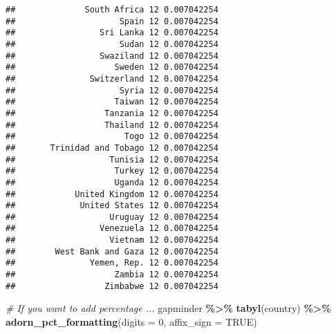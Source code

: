 \documentclass[
]{book}
\newenvironment{Shaded}{\begin{snugshade}}{\end{snugshade}}
\newcommand{\CommentTok}[1]{\textcolor[rgb]{0.56,0.35,0.01}{\textit{#1}}}
\newcommand{\DataTypeTok}[1]{\textcolor[rgb]{0.13,0.29,0.53}{#1}}
\newcommand{\DecValTok}[1]{\textcolor[rgb]{0.00,0.00,0.81}{#1}}
\newcommand{\KeywordTok}[1]{\textcolor[rgb]{0.13,0.29,0.53}{\textbf{#1}}}
\newcommand{\NormalTok}[1]{#1}
\newcommand{\OperatorTok}[1]{\textcolor[rgb]{0.81,0.36,0.00}{\textbf{#1}}}
\newcommand{\OtherTok}[1]{\textcolor[rgb]{0.56,0.35,0.01}{#1}}
\newcommand{\StringTok}[1]{\textcolor[rgb]{0.31,0.60,0.02}{#1}}
\begin{document}
\begin{verbatim}
##              South Africa 12 0.007042254
##                     Spain 12 0.007042254
##                 Sri Lanka 12 0.007042254
##                     Sudan 12 0.007042254
##                 Swaziland 12 0.007042254
##                    Sweden 12 0.007042254
##               Switzerland 12 0.007042254
##                     Syria 12 0.007042254
##                    Taiwan 12 0.007042254
##                  Tanzania 12 0.007042254
##                  Thailand 12 0.007042254
##                      Togo 12 0.007042254
##       Trinidad and Tobago 12 0.007042254
##                   Tunisia 12 0.007042254
##                    Turkey 12 0.007042254
##                    Uganda 12 0.007042254
##            United Kingdom 12 0.007042254
##             United States 12 0.007042254
##                   Uruguay 12 0.007042254
##                 Venezuela 12 0.007042254
##                   Vietnam 12 0.007042254
##        West Bank and Gaza 12 0.007042254
##               Yemen, Rep. 12 0.007042254
##                    Zambia 12 0.007042254
##                  Zimbabwe 12 0.007042254
\end{verbatim}

\begin{Shaded}
\begin{Highlighting}[]
\CommentTok{\# If you want to add percentage ...}
\NormalTok{gapminder }\OperatorTok{\%\textgreater{}\%}
\StringTok{  }\KeywordTok{tabyl}\NormalTok{(country) }\OperatorTok{\%\textgreater{}\%}
\StringTok{  }\KeywordTok{adorn\_pct\_formatting}\NormalTok{(}\DataTypeTok{digits =} \DecValTok{0}\NormalTok{, }\DataTypeTok{affix\_sign =} \OtherTok{TRUE}\NormalTok{)}
\end{Highlighting}
\end{Shaded}
\end{document}
